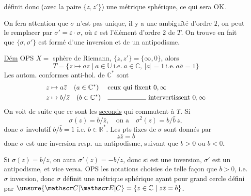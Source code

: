 
définit donc (avec la paire $\{z,z'\}$) une métrique sphérique, ce qui sera OK.

On fera attention  que $\sigma$ n'est pas unique, il y a une ambiguïté d'ordre $2$, on peut le remplacer par $\sigma'=\varepsilon\cdot\sigma$, où $\varepsilon$ est l'élément d'ordre $2$ de $T$. On trouve en fait que $\{\sigma,\sigma'\}$ est formé d'une inversion et de un antipodisme.

\uline{Dém} OPS $X=$ sphère de Riemann, $\{z,z'\}=\{\infty,0\}$, alors
\[
T=\{z\mapsto az\mid a\in\mathbb U\ \text{i.e.}\ a\in\mathbb C,\ |a|=1\ \text{i.e.}\ a\bar a=1\}
\]
Les  autom. conformes anti-hol. de $\mathbb C^*$ sont
\[
\begin{aligned}
z&\mapsto a\bar z\quad(a\in\mathbb C^*)&&\text{ceux qui fixent }0,\infty\\
z&\mapsto b/\bar z\quad(b\in\mathbb C^*)&&\rule{2cm}{.35pt}\ \text{intervertissent }0,\infty
\end{aligned}
\]
On voit  de suite que ce sont les \uline{seconds} qui commutent à $T$.  Si
\[
\sigma(z)=b/\bar z,\quad\text{on a}\quad \sigma^2(z)=b/\bar b\,z,
\]
donc $\sigma$ involutif  $b/\bar b=1$ i.e. $b\in\mathbb R^*$. Les pts fixes de $\sigma$ sont donnés par
\[
z\bar z=b
\]
 donc $\sigma$ est une inversion resp. un antipodisme, suivant que  $b>0$ ou $b<0$.

Si $\sigma(z)=b/\bar z$, on aura $\sigma'(z)=-b/\bar z$,  donc si  \inserted{$\sigma$} est une inversion, $\sigma'$ est un antipodisme, et vice versa. OPS les notations choisies de telle façon que $b>0$, i.e. $\sigma$ inversion, donc $\sigma$ définit une métrique sphérique ayant pour grand cercle défini par $\unsure{\mathscr C|\mathscr E|C}=\{z\in\mathbb C\mid z\bar z=b\}$.

